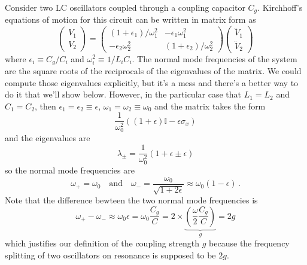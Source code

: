 Consider two LC oscillators coupled through a coupling capacitor $C_g$.
Kirchhoff's equations of motion for this circuit can be written in matrix form
as
\begin{equation}
  \left( \begin{array}{c} V_1 \\ V_2 \end{array} \right)
  =
  \left( \begin{array}{cc}
    (1 + \epsilon_1)/\omega_1^2 & - \epsilon_1  \omega_1^2 \\
    - \epsilon_2  \omega_2^2 & (1 + \epsilon_2)/\omega_2^2
  \end{array} \right)
  \left( \begin{array}{c} \ddot{V}_1 \\ \ddot{V}_2 \end{array} \right)
\end{equation}
where $\epsilon_i \equiv C_g / C_i$ and $\omega_i^2 \equiv 1 / L_i C_i$.
The normal mode frequencies of the system are the square roots of the reciprocals of the eigenvalues of the matrix.
We could compute those eigenvalues explicitly, but it's a mess and there's a better way to do it that we'll show below.
However, in the particular case that $L_1 = L_2$ and $C_1 = C_2$, then $\epsilon_1 = \epsilon_2 \equiv \epsilon$, $\omega_1 = \omega_2 \equiv \omega_0$ and the matrix takes the form
\begin{equation}
  \frac{1}{\omega_0^2} \left( 
    (1 + \epsilon) \mathbb{I} - \epsilon \sigma_x
  \right)
\end{equation}
and the eigenvalues are
\begin{equation}
  \lambda_{\pm} = \frac{1}{\omega_0^2} ( 1 + \epsilon \pm \epsilon)
\end{equation}
so the normal mode frequencies are
\begin{equation}
  \omega_+ = \omega_0 \quad
  \text{and} \quad
  \omega_- = \frac{\omega_0}{\sqrt{1 + 2 \epsilon}}
    \approx \omega_0 (1 - \epsilon) \, .
\end{equation}
Note that the difference bewteen the two normal mode frequencies is
\begin{equation}
  \omega_+ - \omega_- \approx \omega_0 \epsilon
  = \omega_0 \frac{C_g}{C}
  = 2 \times \underbrace{\left(\frac{\omega}{2} \frac{C_g}{C} \right)}_g
  = 2 g
\end{equation}
which justifies our definition of the coupling strength $g$ because the frequency splitting of two oscillators on resonance is supposed to be $2g$.
